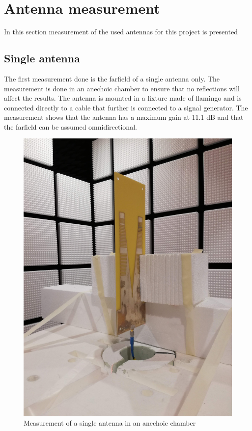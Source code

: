 \chapter{Antenna measurement}
In this section measurement of the used antennas for this project is presented

\section{Single antenna}
The first measurement done is the farfield of a single antenna only. The measurement is done in an anechoic chamber to ensure that no reflections will affect the results. The antenna is mounted in a fixture made of flamingo and is connected directly to a cable that further is connected to a signal generator. The measurement shows that the antenna has a maximum gain at 11.1 dB and that the farfield can be assumed omnidirectional. 

\begin{figure}[H]
\centering 
\includegraphics[scale = 0.05]{figures/measurement/antennas/one_ant.jpg}
\caption{Measurement of a single antenna in an anechoic chamber}
\label{fig:chamber_one_ant}
\end{figure} 

